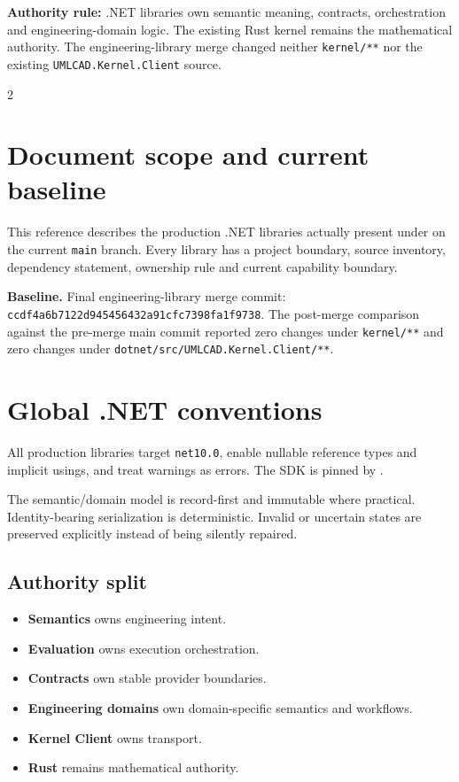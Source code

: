 \documentclass[10pt,a4paper]{article}
\newcommand{\code}[1]{\nolinkurl{#1}}
\newcommand{\filepath}[1]{\path{#1}}
\begin{document}
\begin{center}
\vspace{2mm}
\begin{infobox}
\centering\small
\textbf{Authority rule:} .NET libraries own semantic meaning, contracts, orchestration and engineering-domain logic. The existing Rust kernel remains the mathematical authority. The engineering-library merge changed neither \code{kernel/**} nor the existing \code{UMLCAD.Kernel.Client} source.
\end{infobox}
\end{center}

\begin{multicols}{2}
\raggedcolumns

\section{Document scope and current baseline}
This reference describes the production .NET libraries actually present under \filepath{dotnet/src/} on the current \code{main} branch. Every library has a project boundary, source inventory, dependency statement, ownership rule and current capability boundary.

\begin{authoritybox}
\textbf{Baseline.} Final engineering-library merge commit: \code{ccdf4a6b7122d945456432a91cfc7398fa1f9738}. The post-merge comparison against the pre-merge main commit reported zero changes under \code{kernel/**} and zero changes under \code{dotnet/src/UMLCAD.Kernel.Client/**}.
\end{authoritybox}

\section{Global .NET conventions}
All production libraries target \code{net10.0}, enable nullable reference types and implicit usings, and treat warnings as errors. The SDK is pinned by \filepath{dotnet/global.json}.

The semantic/domain model is record-first and immutable where practical. Identity-bearing serialization is deterministic. Invalid or uncertain states are preserved explicitly instead of being silently repaired.

\subsection{Authority split}
\begin{itemize}
\item \textbf{Semantics} owns engineering intent.
\item \textbf{Evaluation} owns execution orchestration.
\item \textbf{Contracts} own stable provider boundaries.
\item \textbf{Engineering domains} own domain-specific semantics and workflows.
\item \textbf{Kernel Client} owns transport.
\item \textbf{Rust} remains mathematical authority.
\end{itemize}


\end{multicols}
\end{document}
